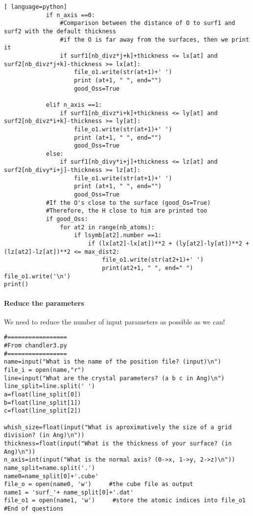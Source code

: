 \begin{lstlisting}[ language=python]
			if n_axis ==0:
				#Comparison between the distance of O to surf1 and surf2 with the default thickness
				#if the O is far away from the surfaces, then we print it
				if surf1[nb_divz*j+k]+thickness <= lx[at] and surf2[nb_divz*j+k]-thickness >= lx[at]:
					file_o1.write(str(at+1)+' ')
					print (at+1, " ", end="")
					good_Oss=True

			elif n_axis ==1:
				if surf1[nb_divz*i+k]+thickness <= ly[at] and  surf2[nb_divz*i+k]-thickness >= ly[at]:
					file_o1.write(str(at+1)+' ')
					print (at+1, " ", end="")
					good_Oss=True
			else:
				if surf1[nb_divy*i+j]+thickness <= lz[at] and surf2[nb_divy*i+j]-thickness >= lz[at]:
					file_o1.write(str(at+1)+' ')
					print (at+1, " ", end="")
					good_Oss=True
			#If the O's close to the surface (good_Os=True)
			#Therefore, the H close to him are printed too             
			if good_Oss:
				for at2 in range(nb_atoms): 
					if lsymb[at2].number ==1: 
						if (lx[at2]-lx[at])**2 + (ly[at2]-ly[at])**2 +(lz[at2]-lz[at])**2 <= max_dist2:                                                                
							file_o1.write(str(at2+1)+' ')
							print(at2+1, " ", end=" ")
file_o1.write('\n')
print()
\end{lstlisting}

\paragraph{Reduce the parameters}
We need to reduce the number of input parameters as possible as we can! 
\lstset{language=Python}
\begin{lstlisting}
#=================
#From chandler3.py
#=================
name=input("What is the name of the position file? (input)\n")
file_i = open(name,"r")
line=input("What are the crystal parameters? (a b c in Ang)\n")
line_split=line.split(' ')
a=float(line_split[0])
b=float(line_split[1])
c=float(line_split[2])

whish_size=float(input("What is aproximatively the size of a grid division? (in Ang)\n"))
thickness=float(input("What is the thickness of your surface? (in Ang)\n"))
n_axis=int(input("What is the normal axis? (0->x, 1->y, 2->z)\n"))
name_split=name.split('.')
name0=name_split[0]+'.cube'
file_o = open(name0, 'w')     #the cube file as output
name1 = 'surf_'+ name_split[0]+'.dat'
file_o1 = open(name1, 'w')     #store the atomic indices into file_o1
#End of questions
\end{lstlisting}

